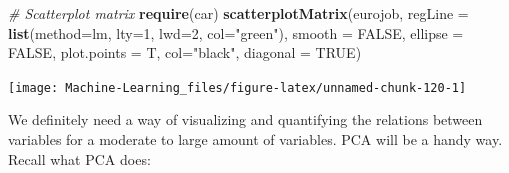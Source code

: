 \documentclass[]{book}
\newenvironment{Shaded}{\begin{snugshade}}{\end{snugshade}}
\newcommand{\KeywordTok}[1]{\textcolor[rgb]{0.13,0.29,0.53}{\textbf{#1}}}
\newcommand{\DataTypeTok}[1]{\textcolor[rgb]{0.13,0.29,0.53}{#1}}
\newcommand{\DecValTok}[1]{\textcolor[rgb]{0.00,0.00,0.81}{#1}}
\newcommand{\StringTok}[1]{\textcolor[rgb]{0.31,0.60,0.02}{#1}}
\newcommand{\CommentTok}[1]{\textcolor[rgb]{0.56,0.35,0.01}{\textit{#1}}}
\newcommand{\OtherTok}[1]{\textcolor[rgb]{0.56,0.35,0.01}{#1}}
\newcommand{\NormalTok}[1]{#1}
\theoremstyle{definition}
\theoremstyle{definition}
\theoremstyle{definition}
\theoremstyle{remark}
\begin{document}
\begin{Shaded}
\begin{Highlighting}[]
\CommentTok{# Scatterplot matrix}
\KeywordTok{require}\NormalTok{(car)}
\KeywordTok{scatterplotMatrix}\NormalTok{(eurojob, }\DataTypeTok{regLine =} \KeywordTok{list}\NormalTok{(}\DataTypeTok{method=}\NormalTok{lm, }\DataTypeTok{lty=}\DecValTok{1}\NormalTok{, }\DataTypeTok{lwd=}\DecValTok{2}\NormalTok{, }\DataTypeTok{col=}\StringTok{"green"}\NormalTok{), }\DataTypeTok{smooth =} \OtherTok{FALSE}\NormalTok{,}
                  \DataTypeTok{ellipse =} \OtherTok{FALSE}\NormalTok{, }\DataTypeTok{plot.points =}\NormalTok{ T, }\DataTypeTok{col=}\StringTok{"black"}\NormalTok{,}
                  \DataTypeTok{diagonal =} \OtherTok{TRUE}\NormalTok{)}
\end{Highlighting}
\end{Shaded}

\begin{center}\texttt{[image: Machine-Learning\_files/figure-latex/unnamed-chunk-120-1]} \end{center}

We definitely need a way of visualizing and quantifying the relations
between variables for a moderate to large amount of variables. PCA will
be a handy way. Recall what PCA does:
\end{document}
